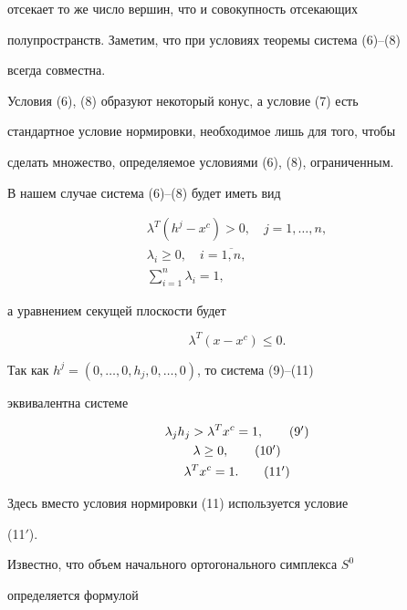 отсекает то же число вершин, что и совокупность отсекающих


полупространств. Заметим, что при условиях теоремы система (6)--(8)


всегда совместна.





Условия (6), (8) образуют некоторый конус, а условие (7) есть


стандартное условие нормировки, необходимое лишь для того, чтобы


сделать множество, определяемое условиями (6), (8), ограниченным.





В нашем случае система (6)--(8) будет иметь вид


\begin{gather}


\lambda^T(h^j-x^c)>0,\quad j=1,\dotsc,n,\\


\lambda_i\ge 0,\quad i=\overline{1,n},\\


\sum^n_{i=1}\lambda_i=1,


\end{gather}


а уравнением секущей плоскости будет


$$


\lambda^T(x-x^c)\le 0.


$$


Так как $h^j=(0,\dotsc,0,h_j,0,\dotsc,0)$, то система (9)--(11)


эквивалентна системе


\begin{gather*}


\lambda_jh_j>\lambda^Tx^c=1,\tag{9${}'$} \\


\lambda\ge 0,\tag{10${}'$} \\


\lambda^Tx^c=1.\tag{11${}'$}


\end{gather*}


Здесь вместо условия нормировки (11) используется условие


(11${}'$).





Известно, что объем начального ортогонального симплекса $S^0$


определяется формулой


